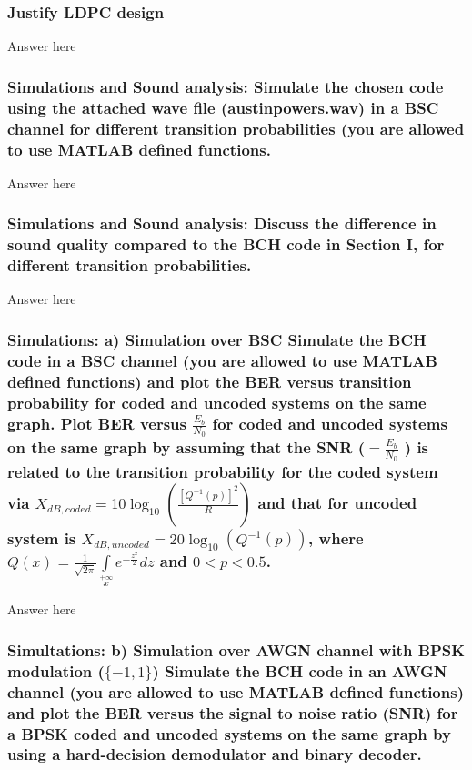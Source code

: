 \documentclass[a4paper]{report}
\begin{document}
\subsubsection*{Justify LDPC design}

Answer here \\

\subsubsection*{Simulations and Sound analysis: Simulate the chosen code using the attached wave file (austinpowers.wav) in a BSC channel for different transition probabilities (you are allowed to use MATLAB defined functions.}

Answer here \\

\subsubsection*{Simulations and Sound analysis: Discuss the difference in sound quality compared to the BCH code in Section I, for different transition probabilities.}

Answer here \\

\subsubsection*{Simulations: a) Simulation over BSC Simulate the BCH code in a BSC channel (you are allowed to use MATLAB defined functions) and plot the BER versus transition probability for coded and uncoded systems on the same graph. Plot BER versus $\frac{E_b}{N_0}$ for coded and uncoded systems on the same graph by assuming that the SNR ($ = \frac{E_b}{N_0}$ ) is related to the transition probability for the coded system via $X_{dB,coded} = 10 \log_{10}(\frac{[Q^{−1} (p)]^2}{R}) $ and that for uncoded system is $X_{dB,uncoded} = 20\log_{10}(Q^{−1} (p)) $, where $Q(x) = \frac{1}{\sqrt{2 \pi}} \int\limits_{x}\limits^{+\infty} e^{ -\frac{z^2}{2}} dz $ and $0 < p < 0.5$.}

Answer here \\

\subsubsection*{Simultations: b) Simulation over AWGN channel with BPSK modulation ($\{−1, 1\}$) Simulate the BCH code in an AWGN channel (you are allowed to use MATLAB defined functions) and plot the BER versus the signal to noise ratio (SNR) for a BPSK coded and uncoded
systems on the same graph by using a hard-decision demodulator and binary decoder.}
\end{document}
